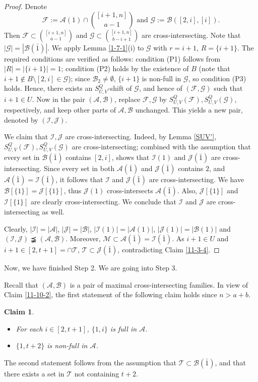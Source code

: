 \documentclass[11pt]{article}
\def\marrow{{\boldmath {\marginpar[\hfill$\rightarrow \rightarrow$]{$\leftarrow \leftarrow$}}}}
\def\andrey#1{{\sc Andrey: }{\marrow\sf \textcolor{blue}{#1}}}
\newcommand{\m}{\mathcal}
\newtheorem{claim}[theorem]{Claim}
\begin{document}
\begin{proof}
Denote 
\[
\m F:=\m A(1)\cap {[i+1,n]\choose a-1} \text{ and } \m G:=\m B([2,i],[i]).
\]
Then $\m F \subset {[i+1, n]\choose a-1}$ and $\m G\subset {[i+1,n]\choose b-i+1}$ are cross-intersecting. Note that $|\m G|=|\m B(\bar 1)|$. 
We apply Lemma \ref{1-7-1}(i) to $\m G$ with $r=i+1$, $R=\{i+1\}$. The required conditions are verified as follows: condition (P1) follows from $|R|=|\{i+1\}|=1$; condition (P2) holds by the existence of $B$ (note that $i+1\not\in B\setminus [2,i] \in \m G$);
since $\m B_2\ne \emptyset$,  $\{i+1\}$ is non-full in $\m G$, so condition (P3) holds. 
Hence, there exists an $S^Q_{U,V}$-shift of $\m G$, and hence of $(\m F, \m G)$ such that $i+1\in U$. 
Now in the pair $(\m A, \m B)$, replace $\m F, \m G$ by $S_{U,V}^Q(\m F), S_{U,V}^Q(\m G)$, respectively, and keep other parts of $\m A, \m B$ unchanged. This yields a new pair, denoted by $(\m I, \m J)$.

We claim that $\m I, \m J$ are cross-intersecting. 
Indeed, by Lemma \ref{SUV'}, $S_{U,V}^Q(\m F), S_{U,V}^Q(\m G)$ are cross-intersecting; combined with the assumption that every set in $\m B(\bar1)$ contains $[2,i]$, shows that $\m I(1)$ and $\m J(\bar1)$ are cross-intersecting. 
Since every set in both $\m A(\bar1)$ and $\m J(\bar1)$ contains $2$, and $\m A(\bar1)=\m I(\bar1)$, it follows that  $\m I$ and $\m J(\bar1)$ are cross-intersecting. We have $\m B[\{1\}]=\m J[\{1\}]$, thus $\m J(1)$ cross-intersects $\m A(\bar 1)$. Also, $\m J[\{1\}]$ and $\m I[\{1\}]$ are clearly cross-intersecting. We conclude that $\m I$ and  $\m J$ are cross-intersecting as well. 

Clearly, $|\m I|=|\m A|$, $|\m J|=|\m B|$, $|\m I(1)|=|\m A(1)|$, $|\m J(1)|=|\m B(1)|$ and $(\m I, \m J)\precneqq (\m A, \m B)$. 
Moreover, $\m M\subset \m A(\bar1)=\m I(\bar1)$. 
As $i+1\in U$ and $i+1\in [2,t+1] =\cap \m T$, $\m T\subset \m J(\bar1)$, contradicting Claim \ref{11-3-4}.
\end{proof}

Now, we have finished Step 2. We are going into Step 3. 

Recall that $(\m A, \m B)$ is a pair of maximal cross-intersecting families.
In view of Claim \ref{11-10-2}, the first statement of the following claim holds since $n>a+b$.
\begin{claim}\label{propertyA}
\begin{itemize}
\item[(i)] For each $i \in [2, t+1]$, $\{1, i\}$ is full in $\mathcal{A}$.
\item[(ii)] $\{1, t+2\}$ is non-full in $\mathcal{A}$.
\end{itemize}
\end{claim}
The second statement follows from the assumption that $\m T \subset \m B(\bar1)$, and that there exists a set in $\m T$ not containing $t+2$. 
\end{document}
